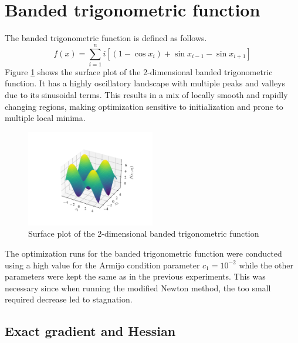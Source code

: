 \section{Banded trigonometric function}
\label{sec:banded_trigonometric_results}

The banded trigonometric function is defined as follows.
\begin{equation}
f(x) = \sum_{i=1}^n i[(1-\cos x_i) + \sin x_{i-1} - \sin x_{i+1}]
\end{equation}
Figure \ref{fig:banded_trigonometric_surf} shows the surface plot of the 2-dimensional banded trigonometric function.
It has a highly oscillatory landscape with multiple peaks and valleys due to its sinusoidal terms.
This results in a mix of locally smooth and rapidly changing regions, making optimization sensitive to initialization and prone to multiple local minima.
\begin{figure}
    \centering
    \includegraphics[width=0.5\textwidth]{figures/banded_trigonometric_surf.pdf}
    \caption{Surface plot of the 2-dimensional banded trigonometric function}
    \label{fig:banded_trigonometric_surf}
\end{figure}
The optimization runs for the banded trigonometric function were conducted using a high value for the Armijo condition parameter $c_1 = 10^{-2}$ while the other parameters were kept the same as in the previous experiments.
This was necessary since when running the modified Newton method, the too small required decrease led to stagnation.

\subsection{Exact gradient and Hessian}

